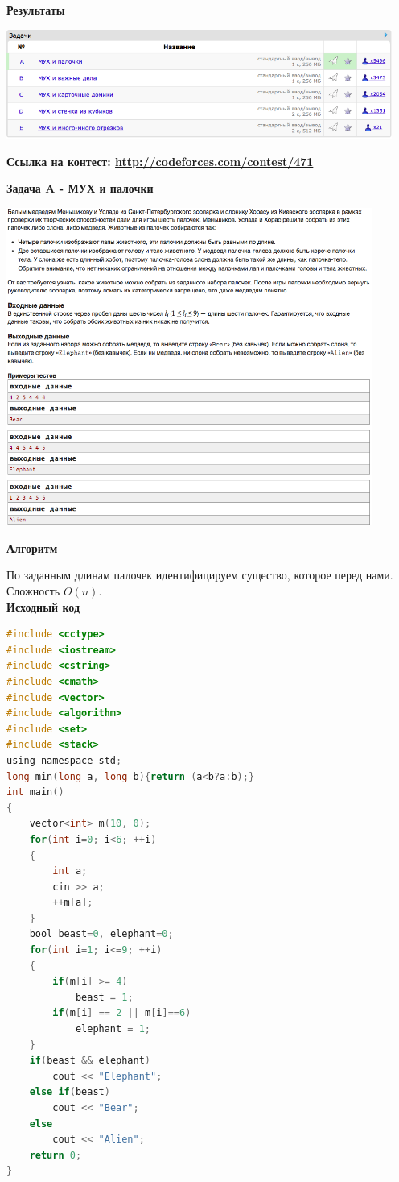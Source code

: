 \documentclass[a4paper,12pt]{article}
\begin{document}
\textbf{{\large Результаты}} \\
\begin{center}
\includegraphics[width=0.95\textwidth]{C_269/A_C_269_result.png}\\ [1cm]
\end{center}

\textbf{{\large Ссылка на контест: \url{http://codeforces.com/contest/471}}}

\newpage
\textbf{{\large Задача A - МУХ и палочки}} \\
\begin{center}
\includegraphics[width=0.9\textwidth]{C_269/C_269_A.png}\\ [1cm]
\end{center}

\newpage
\textbf{{\large Алгоритм}}

По заданным длинам палочек идентифицируем существо, которое перед нами. Сложность $O(n)$.\\

\textbf{{\large Исходный код}} \\
\begin{lstlisting}[language=C]
#include <cctype>
#include <iostream>
#include <cstring>
#include <cmath>
#include <vector>
#include <algorithm>
#include <set>
#include <stack>
using namespace std;
long min(long a, long b){return (a<b?a:b);}
int main()
{
    vector<int> m(10, 0);
    for(int i=0; i<6; ++i)
    {
        int a;
        cin >> a;
        ++m[a];
    }
    bool beast=0, elephant=0;
    for(int i=1; i<=9; ++i)
    {
        if(m[i] >= 4)
            beast = 1;
        if(m[i] == 2 || m[i]==6)
            elephant = 1;
    }
    if(beast && elephant)
        cout << "Elephant";
    else if(beast)
        cout << "Bear";
    else
        cout << "Alien";
    return 0;
}
\end{lstlisting}
\end{document}
